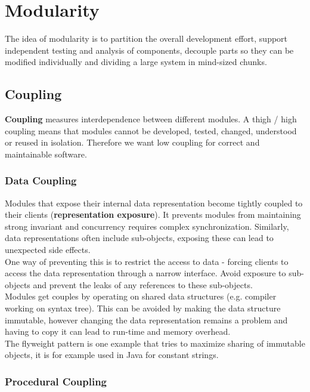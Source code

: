 \section{Modularity}

The idea of modularity is to partition the overall development effort, support independent testing and analysis of components, decouple parts so they can be modified individually and dividing a large system in mind-sized chunks.

\subsection{Coupling}

\textbf{Coupling} measures interdependence between different modules. A thigh / high coupling means that modules cannot be developed, tested, changed, understood or reused in isolation. Therefore we want low coupling for correct and maintainable software.

\subsubsection{Data Coupling}

Modules that expose their internal data representation become tightly coupled to their clients (\textbf{representation exposure}). It prevents modules from maintaining strong invariant and concurrency requires complex synchronization. Similarly, data representations often include sub-objects, exposing these can lead to unexpected side effects. \\

One way of preventing this is to restrict the access to data - forcing clients to access the data representation through a narrow interface. Avoid exposure to sub-objects and prevent the leaks of any references to these sub-objects. \\

Modules get couples by operating on shared data structures (e.g. compiler working on syntax tree). This can be avoided by making the data structure immutable, however changing the data representation remains a problem and having to copy it can lead to run-time and memory overhead. \\

The flyweight pattern is one example that tries to maximize sharing of immutable objects, it is for example used in Java for constant strings.

\subsubsection{Procedural Coupling}

